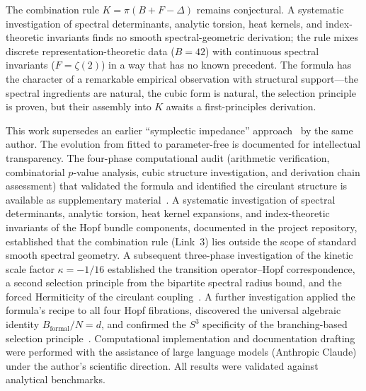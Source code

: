 \documentclass[aps,prl,twocolumn,superscriptaddress]{revtex4-2}
\begin{document}
The combination rule $K = \pi(B + F - \Delta)$ remains conjectural.
A systematic investigation of spectral determinants, analytic torsion,
heat kernels, and index-theoretic invariants finds no smooth
spectral-geometric derivation; the rule mixes discrete
representation-theoretic data ($B = 42$) with continuous spectral
invariants ($F = \zeta(2)$) in a way that has no known precedent.
The formula has the character of a remarkable empirical observation
with structural support---the spectral ingredients are natural, the
cubic form is natural, the selection principle is proven, but their
assembly into $K$ awaits a first-principles derivation.


\begin{acknowledgments}
This work supersedes an earlier ``symplectic impedance''
approach~\cite{paper2_old} by the same author. The evolution from
fitted to parameter-free is documented for intellectual transparency.
The four-phase computational audit (arithmetic verification,
combinatorial $p$-value analysis, cubic structure investigation, and
derivation chain assessment) that validated the formula and identified
the circulant structure is available as supplementary
material~\cite{phase2_audit}. A systematic investigation of spectral
determinants, analytic torsion, heat kernel expansions, and
index-theoretic invariants of the Hopf bundle components, documented
in the project repository, established that the combination rule
(Link~3) lies outside the scope of standard smooth spectral geometry.
A subsequent three-phase investigation of the kinetic scale factor
$\kappa = -1/16$ established the transition operator--Hopf
correspondence, a second selection principle from the bipartite
spectral radius bound, and the forced Hermiticity of the circulant
coupling~\cite{phase1_kappa,phase2_kappa,phase3_audit}.
A further investigation applied the formula's recipe to all four Hopf
fibrations, discovered the universal algebraic identity
$B_{\mathrm{formal}}/N = d$, and confirmed the $S^3$ specificity of
the branching-based selection
principle~\cite{phase6_hopf}.
Computational implementation and documentation drafting were performed
with the assistance of large language models (Anthropic Claude) under
the author's scientific direction. All results were validated against
analytical benchmarks.
\end{acknowledgments}
\end{document}
